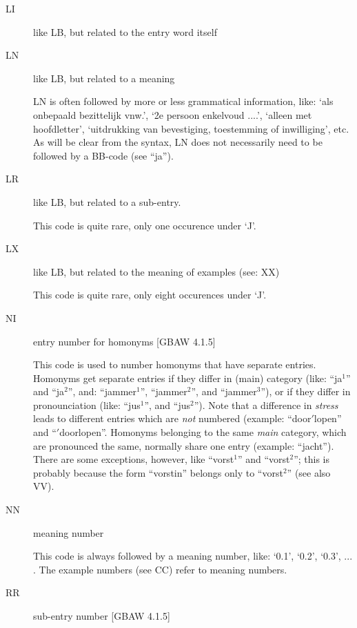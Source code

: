 \begin{description}
   \item [LI] like LB, but related to the entry word itself

   \item [LN] like LB, but related to a meaning
 
         LN is often followed by more or less grammatical information, like:
         `als onbepaald bezittelijk vnw.', `2e persoon enkelvoud ....', 
         `alleen met hoofdletter', `uitdrukking van bevestiging, toestemming 
         of inwilliging', etc. As will be clear from the syntax, LN does not
         necessarily need to be followed by a BB-code (see ``ja''). 

   \item [LR] like LB, but related to a sub-entry. 

         This code is quite rare, only one occurence under `J'.

   \item [LX] like LB, but related to the meaning of examples (see: XX)

         This code is quite rare, only eight occurences under `J'.

   \item [NI] entry number for homonyms [GBAW 4.1.5]

         This code is used to number homonyms that have separate entries.
         Homonyms get separate entries if they differ in (main) category
         (like: ``ja$^{1}$'' and ``ja$^{2}$'', and: ``jammer$^{1}$'', 
         ``jammer$^{2}$'', and ``jammer$^{3}$''), or if they differ in 
         pronounciation (like: ``jus$^{1}$'', 
         and ``jus$^{2}$''). Note that a difference in {\em stress}
         leads to different
         entries which are {\em not} numbered (example: ``door$'$lopen'' and 
         ``$'$doorlopen''. Homonyms belonging to the same {\em main} category,
         which are pronounced the same, normally share one entry (example: 
         ``jacht''). There are some exceptions, however, like ``vorst$^{1}$'' 
         and
         ``vorst$^{2}$''; this is probably because the form ``vorstin'' belongs
         only to ``vorst$^{2}$'' (see also VV).

   \item [NN] meaning number

        This code is always followed by a meaning number, like: `0.1', `0.2', 
        `0.3', ... . The example numbers (see CC) refer to meaning numbers.

   \item [RR] sub-entry number [GBAW 4.1.5]


\end{description}
